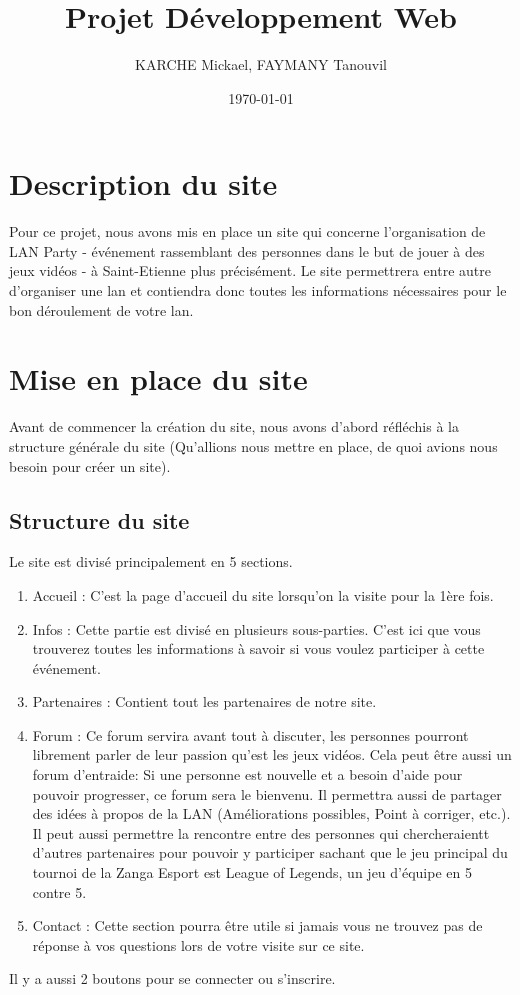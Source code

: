 \documentclass[a4paper, 11pt]{article}
\title{Projet Développement Web}
\author{KARCHE Mickael, FAYMANY Tanouvil}
\date{\today}
\begin{document}
\maketitle

\newpage

\tableofcontents

\newpage

\section{Description du site}
Pour ce projet, nous avons mis en place un site qui concerne l'organisation de LAN Party - événement rassemblant des personnes dans le but de jouer à des jeux vidéos - à Saint-Etienne plus précisément.
Le site permettrera entre autre d'organiser une lan et contiendra donc toutes les informations nécessaires pour le bon déroulement de votre lan.

\section{Mise en place du site}
Avant de commencer la création du site, nous avons d'abord réfléchis à la structure générale du site (Qu'allions nous mettre en place, de quoi avions nous besoin pour créer un site).

\subsection{Structure du site}
Le site est divisé principalement en 5 sections.
\begin{enumerate}
\item Accueil : C'est la page d'accueil du site lorsqu'on la visite pour la 1ère fois.
\item Infos : Cette partie est divisé en plusieurs sous-parties. C'est ici que vous trouverez toutes les informations à savoir si vous voulez participer à cette événement.
\item Partenaires : Contient tout les partenaires de notre site.
\item Forum : Ce forum servira avant tout à discuter, les personnes pourront librement parler de leur passion qu'est les jeux vidéos.
  Cela peut être aussi un forum d'entraide: Si une personne est nouvelle et a besoin d'aide pour pouvoir progresser, ce forum sera le bienvenu.
  Il permettra aussi de partager des idées à propos de la LAN (Améliorations possibles, Point à corriger, etc.).
  Il peut aussi permettre la rencontre entre des personnes qui chercheraientt d'autres partenaires pour pouvoir y participer sachant que le jeu principal du tournoi de la Zanga Esport est League of Legends, un jeu d'équipe en 5 contre 5.
\item Contact : Cette section pourra être utile si jamais vous ne trouvez pas de réponse à vos questions lors de votre visite sur ce site.
\end{enumerate}
Il y a aussi 2 boutons pour se connecter ou s'inscrire.
\end{document}
